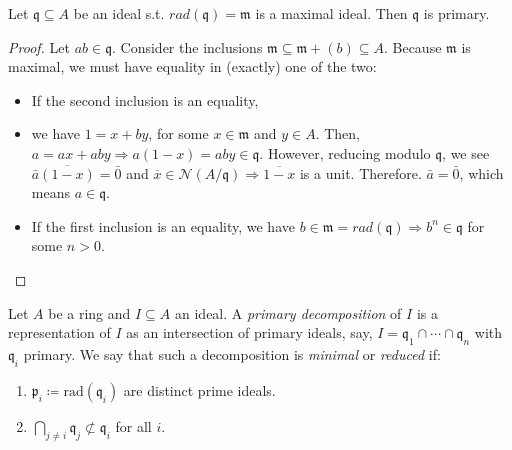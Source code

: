 \begin{prop}
    Let $\mathfrak{q} \subseteq A$ be an ideal s.t.
    $rad(\mathfrak{q}) = \mathfrak{m}$ is a maximal ideal.
    Then $\mathfrak{q}$ is primary.

    \begin{proof}
        Let $ab \in \mathfrak{q}$.
        Consider the inclusions $\mathfrak{m} \subseteq \mathfrak{m} + (b) \subseteq A$.
        Because $\mathfrak{m}$ is maximal, we must have equality in (exactly) one of the two:

        \begin{itemize}

            \item If the second inclusion is an equality,
            \item we have $1 = x + by$, for some $x \in \mathfrak{m}$ and $y \in A$.
            Then, $a = ax + aby \Rightarrow a(1-x) = aby \in \mathfrak{q}$.
            However, reducing modulo $\mathfrak{q}$, we see $\bar{a}\overline{(1-x)} = \bar{0}$
            and $\overline{x} \in \mathcal{N}(A/\mathfrak{q}) \Rightarrow \overline{1-x}$ is a unit.
            Therefore. $\bar{a} = \bar{0}$, which means $a \in \mathfrak{q}$.

            \item If the first inclusion is an equality, we have
            $b \in \mathfrak{m} = rad(\mathfrak{q})
            \Rightarrow b^n \in \mathfrak{q}$ for some $n > 0$.

        \end{itemize}
    \end{proof}

\end{prop}

\begin{defn}
    Let $A$ be a ring and $I \subseteq A$ an ideal.
    A \emph{primary decomposition} of $I$ is a representation of $I$
    as an intersection of primary ideals,
    say, $I = \mathfrak{q}_1 \cap \cdots \cap \mathfrak{q}_n$ with $\mathfrak{q}_i$ primary.
    We say that such a decomposition is \emph{minimal} or \emph{reduced} if:

    \begin{enumerate}
        \item
        $\mathfrak{p}_i \coloneqq \text{rad}(\mathfrak{q}_i)$
        are distinct prime ideals. \label{item:distinct-primes}

        \item
        $\bigcap_{j \neq i} \mathfrak{q}_j \not\subset \mathfrak{q}_i $
        for all $i$. \label{item:noninclusion}
    \end{enumerate}
\end{defn}

